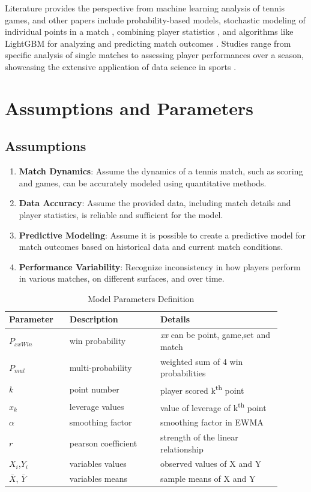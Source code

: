 \documentclass{mcmthesis}
\begin{document}
Literature \cite{4} provides the perspective from machine learning analysis of tennis games, and other papers include probability-based models, stochastic modeling of individual points in a match \cite{8}, combining player statistics \cite{7}, and  algorithms like LightGBM for analyzing and predicting match outcomes \cite{11}. Studies range from specific analysis of single matches to assessing player performances over a season, showcasing the extensive application of data science in sports \cite{5}.

\section{Assumptions and Parameters}
\subsection{Assumptions}
\begin{enumerate}
  \item \textbf{Match Dynamics}: Assume the dynamics of a tennis match, such as scoring and games, can be accurately modeled using quantitative methods.
  \item \textbf{Data Accuracy}: Assume the provided data, including match details and player statistics, is reliable and sufficient for the model.
  \item \textbf{Predictive Modeling}: Assume it is possible to create a predictive model for match outcomes based on historical data and current match conditions.
  \item \textbf{Performance Variability}: Recognize inconsistency in how players perform in various matches, on different surfaces, and over time.
\end{enumerate}

\begin{table}[ht]
\centering
\begin{tabular}{p{0.2\linewidth}p{0.3\linewidth}p{0.4\linewidth}}
   \toprule
   \textbf{Parameter} & \textbf{Description} & \textbf{Details} \\
   \midrule
   $P_\textit{xxWin}$ & win probability & \emph{xx} can be point, game,set and match \\
   $P_\textit{mul}$ & multi-probability & weighted sum of 4 win probabilities \\
   $k$ & point number & player scored k\textsuperscript{th} point \\
   $x_k$ & leverage values & value of leverage of k\textsuperscript{th} point \\
   $\alpha$ & smoothing factor & smoothing factor in  EWMA \\
   $r$ & pearson coefficient & strength of the linear relationship \\
   $X_i$,$Y_i$& variables values & observed values of X and Y \\
   $\bar{X}$, $\bar{Y}$& variables means & sample means of X and Y \\   
   \bottomrule
\end{tabular}
\caption{Model Parameters Definition}
\label{tab:parameters}
\end{table}
\end{document}

